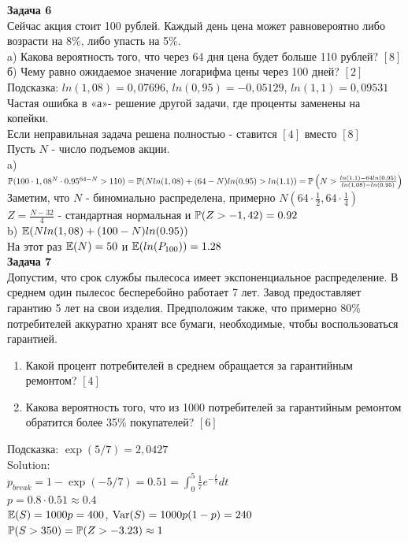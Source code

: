 \documentclass[12pt, a4paper]{article}\usepackage[]{graphicx}\usepackage[]{color}
\begin{document}
\textbf{Задача 6} \\ %
Сейчас акция стоит 100 рублей. Каждый день цена может равновероятно либо возрасти на 8\%, либо упасть на 5\%. \\
a) Какова вероятность того, что через 64 дня цена будет больше 110 рублей? $[8]$ \\
б) Чему равно ожидаемое значение логарифма цены через 100 дней? $[2]$ \\
Подсказка: $ln(1,08)=0,07696$, $ln(0,95)=-0,05129$, $ln(1,1)=0,09531$ \\
Частая ошибка в «а»- решение другой задачи, где проценты заменены на копейки. \\
Если неправильная задача решена полностью - ставится $[4]$ вместо $[8]$ \\
Пусть $N$ - число подъемов акции. \\
a) $\P(100\cdot 1,08^N\cdot 0.95^{64-N}>110)=\\
\P(Nln(1,08)+(64-N)ln(0.95)>ln(1.1))=\\
\P\left(N>\frac{ln(1,1)-64ln(0,95)}{ln(1,08)-ln(0.95)}\right)$\\
Заметим, что $N$ - биномиально распределена, примерно $N(64\cdot\frac{1}{2},64\cdot\frac{1}{4})$\\
$Z=\frac{N-32}{4}$ - стандартная нормальная и $\P(Z>-1,42)=0.92$ \\
b) $\E(Nln(1,08)+(100-N)ln(0.95))$ \\
На этот раз $\E(N)=50$ и $\E(ln(P_{100}))=1.28$ \\



\textbf{Задача 7} \\
Допустим, что срок службы пылесоса имеет экспоненциальное распределение. В среднем один пылесос бесперебойно работает 7 лет. Завод предоставляет гарантию 5 лет на свои изделия. Предположим также, что примерно 80\% потребителей аккуратно хранят все бумаги, необходимые, чтобы воспользоваться гарантией.
\begin{enumerate}
\item Какой процент потребителей в среднем обращается за гарантийным ремонтом? $[4]$ \\
\item Какова вероятность того, что из 1000 потребителей за гарантийным ремонтом обратится более 35\% покупателей? $[6]$ \\
\end{enumerate}
Подсказка: $\exp(5/7)=2,0427$ \\
Solution: \\
$p_{break}=1-\exp(-5/7)=0.51=\int_{0}^{5}\frac{1}{7}e^{-\frac{t}{7}}dt$ \\
$p=0.8\cdot 0.51\approx 0.4$ \\
$\E(S)=1000p=400$, $\Var(S)=1000p(1-p)=240$ \\
$\P(S>350)=\P(Z>-3.23)\approx 1$ \\
\end{document}
